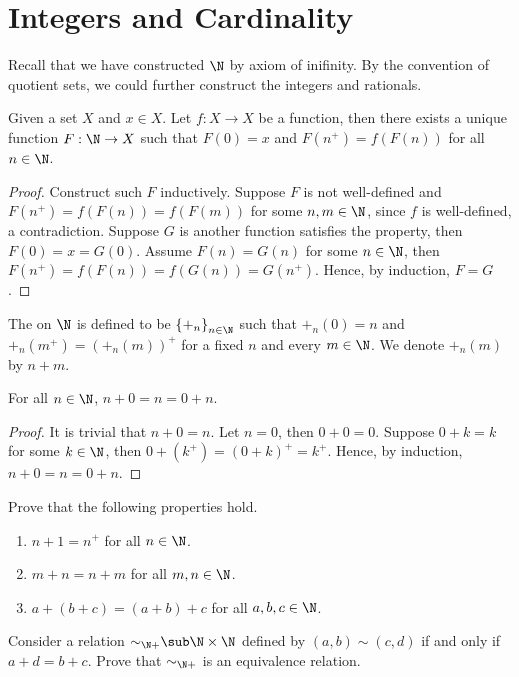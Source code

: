 \documentclass[10pt]{article}
\begin{document}
\section{Integers and Cardinality}
Recall that we have constructed $\N$ by axiom of inifinity. By the convention of quotient sets, we could further construct the integers and rationals.
\begin{theorem}[recursion]
    Given a set $X$ and $x\in X$. Let $f:X\to X$ be a function, then there exists a unique function $F:\N\to X$ such that $F(0)=x$ and $F({n}^{+})=f(F(n))$ for all $n\in\N$.
\end{theorem}
\begin{proof}
    Construct such $F$ inductively. Suppose $F$ is not well-defined and $F({n}^{+})=f(F(n))=f(F(m))$ for some $n,m\in\N$, since $f$ is well-defined, a contradiction. Suppose $G$ is another function satisfies the property, then $F(0)=x=G(0)$. Assume $F(n)=G(n)$ for some $n\in\N$, then $F({n}^{+})=f(F(n))=f(G(n))=G({n}^{+})$. Hence, by induction, $F=G$.
\end{proof}
\begin{definition}
    The  on $\N$ is defined to be ${\{{+}_{n}\}}_{n\in\N}$ such that ${+}_{n}(0)=n$ and ${+}_{n}({m}^{+})={({+}_{n}(m))}^{+}$ for a fixed $n$ and every $m\in\N$. We denote ${+}_{n}(m)$ by $n+m$.
\end{definition}
\begin{proposition}
    For all $n\in\N$, $n+0=n=0+n$.
\end{proposition}
\begin{proof}
    It is trivial that $n+0=n$. Let $n=0$, then $0+0=0$. Suppose $0+k=k$ for some $k\in\N$, then $0+({k}^{+})={(0+k)}^{+}={k}^{+}$. Hence, by induction, $n+0=n=0+n$.
\end{proof}
\begin{problem}
    Prove that the following properties hold.
    \begin{enumerate}
        \item $n+1={n}^{+}$ for all $n\in\N$.
        \item $m+n=n+m$ for all $m,n\in\N$.
        \item $a+(b+c)=(a+b)+c$ for all $a,b,c\in\N$.
    \end{enumerate}
\end{problem}
\begin{problem}
    Consider a relation ${\sim}_{\N+}\sub\N\times\N$ defined by $(a,b)\sim(c,d)$ if and only if $a+d=b+c$. Prove that ${\sim}_{\N+}$ is an equivalence relation.
\end{problem}
\end{document}
